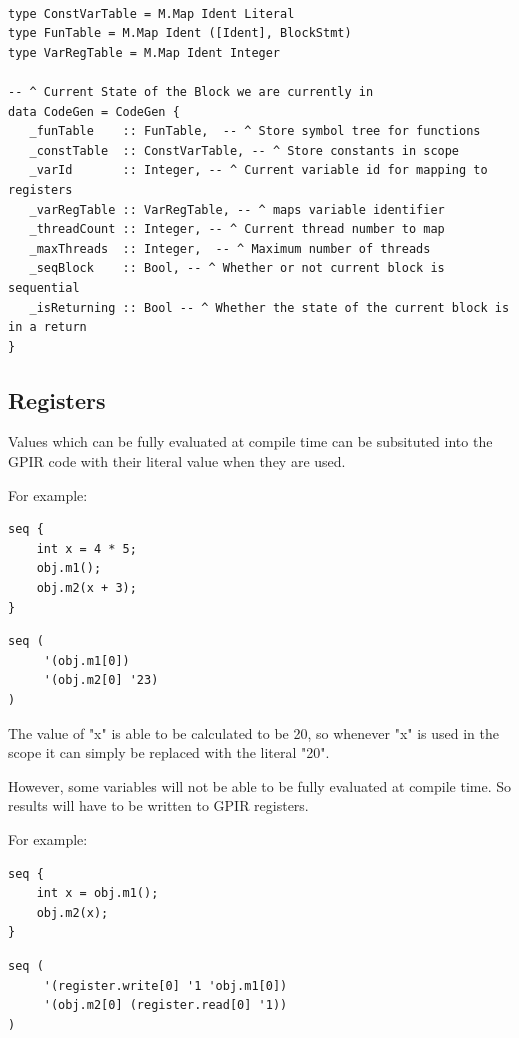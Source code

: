 \begin{lstlisting}[style=myHaskell]

type ConstVarTable = M.Map Ident Literal
type FunTable = M.Map Ident ([Ident], BlockStmt)
type VarRegTable = M.Map Ident Integer

-- ^ Current State of the Block we are currently in
data CodeGen = CodeGen {
   _funTable    :: FunTable,  -- ^ Store symbol tree for functions
   _constTable  :: ConstVarTable, -- ^ Store constants in scope
   _varId       :: Integer, -- ^ Current variable id for mapping to registers
   _varRegTable :: VarRegTable, -- ^ maps variable identifier
   _threadCount :: Integer, -- ^ Current thread number to map
   _maxThreads  :: Integer,  -- ^ Maximum number of threads
   _seqBlock    :: Bool, -- ^ Whether or not current block is sequential
   _isReturning :: Bool -- ^ Whether the state of the current block is in a return
}

\end{lstlisting}


\subsection{Registers}
Values which can be fully evaluated at compile time can be subsituted into the
GPIR code with their literal value when they are used.

For example:

\begin{lstlisting}[style=myGPC, frame=single]
seq {
    int x = 4 * 5;
    obj.m1();
    obj.m2(x + 3);
}
\end{lstlisting}

\begin{lstlisting}[style=myGPIR, frame=single]
seq (
     '(obj.m1[0]) 
     '(obj.m2[0] '23)
)
\end{lstlisting}

The value of "x" is able to be calculated to be 20, so whenever
"x" is used in the scope it can simply be replaced with the literal "20".

However, some variables will not be able to be fully evaluated at compile time.
So results will have to be written to GPIR registers.

For example:

\begin{lstlisting}[style=myGPC, frame=single]
seq {
    int x = obj.m1();
    obj.m2(x);
}
\end{lstlisting}

\begin{lstlisting}[style=myGPIR, frame=single]
seq (
     '(register.write[0] '1 'obj.m1[0]) 
     '(obj.m2[0] (register.read[0] '1))
)
\end{lstlisting}


